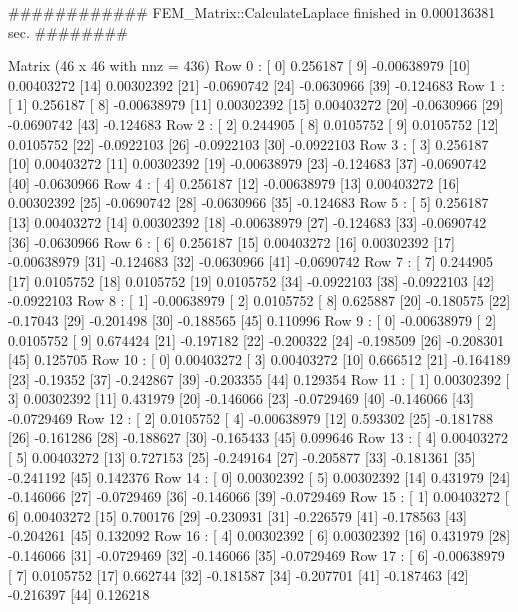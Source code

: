 ############   FEM_Matrix::CalculateLaplace finished in  0.000136381 sec.    ########

Matrix  (46 x 46  with  nnz = 436)
Row 0 : [ 0]  0.256187  [ 9]  -0.00638979  [10]  0.00403272  [14]  0.00302392  [21]  -0.0690742  [24]  -0.0630966  [39]  -0.124683  
Row 1 : [ 1]  0.256187  [ 8]  -0.00638979  [11]  0.00302392  [15]  0.00403272  [20]  -0.0630966  [29]  -0.0690742  [43]  -0.124683  
Row 2 : [ 2]  0.244905  [ 8]  0.0105752  [ 9]  0.0105752  [12]  0.0105752  [22]  -0.0922103  [26]  -0.0922103  [30]  -0.0922103  
Row 3 : [ 3]  0.256187  [10]  0.00403272  [11]  0.00302392  [19]  -0.00638979  [23]  -0.124683  [37]  -0.0690742  [40]  -0.0630966  
Row 4 : [ 4]  0.256187  [12]  -0.00638979  [13]  0.00403272  [16]  0.00302392  [25]  -0.0690742  [28]  -0.0630966  [35]  -0.124683  
Row 5 : [ 5]  0.256187  [13]  0.00403272  [14]  0.00302392  [18]  -0.00638979  [27]  -0.124683  [33]  -0.0690742  [36]  -0.0630966  
Row 6 : [ 6]  0.256187  [15]  0.00403272  [16]  0.00302392  [17]  -0.00638979  [31]  -0.124683  [32]  -0.0630966  [41]  -0.0690742  
Row 7 : [ 7]  0.244905  [17]  0.0105752  [18]  0.0105752  [19]  0.0105752  [34]  -0.0922103  [38]  -0.0922103  [42]  -0.0922103  
Row 8 : [ 1]  -0.00638979  [ 2]  0.0105752  [ 8]  0.625887  [20]  -0.180575  [22]  -0.17043  [29]  -0.201498  [30]  -0.188565  [45]  0.110996  
Row 9 : [ 0]  -0.00638979  [ 2]  0.0105752  [ 9]  0.674424  [21]  -0.197182  [22]  -0.200322  [24]  -0.198509  [26]  -0.208301  [45]  0.125705  
Row 10 : [ 0]  0.00403272  [ 3]  0.00403272  [10]  0.666512  [21]  -0.164189  [23]  -0.19352  [37]  -0.242867  [39]  -0.203355  [44]  0.129354  
Row 11 : [ 1]  0.00302392  [ 3]  0.00302392  [11]  0.431979  [20]  -0.146066  [23]  -0.0729469  [40]  -0.146066  [43]  -0.0729469  
Row 12 : [ 2]  0.0105752  [ 4]  -0.00638979  [12]  0.593302  [25]  -0.181788  [26]  -0.161286  [28]  -0.188627  [30]  -0.165433  [45]  0.099646  
Row 13 : [ 4]  0.00403272  [ 5]  0.00403272  [13]  0.727153  [25]  -0.249164  [27]  -0.205877  [33]  -0.181361  [35]  -0.241192  [45]  0.142376  
Row 14 : [ 0]  0.00302392  [ 5]  0.00302392  [14]  0.431979  [24]  -0.146066  [27]  -0.0729469  [36]  -0.146066  [39]  -0.0729469  
Row 15 : [ 1]  0.00403272  [ 6]  0.00403272  [15]  0.700176  [29]  -0.230931  [31]  -0.226579  [41]  -0.178563  [43]  -0.204261  [45]  0.132092  
Row 16 : [ 4]  0.00302392  [ 6]  0.00302392  [16]  0.431979  [28]  -0.146066  [31]  -0.0729469  [32]  -0.146066  [35]  -0.0729469  
Row 17 : [ 6]  -0.00638979  [ 7]  0.0105752  [17]  0.662744  [32]  -0.181587  [34]  -0.207701  [41]  -0.187463  [42]  -0.216397  [44]  0.126218  
